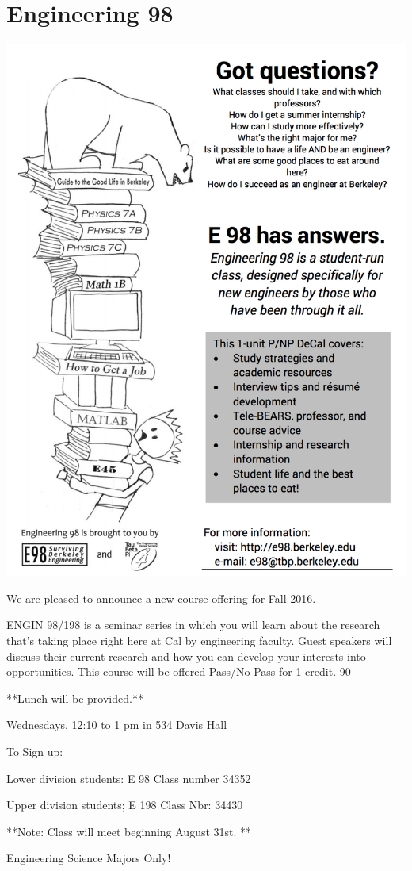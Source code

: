 \chapter*{Engineering 98}

\includegraphics{resources/e98-flyer}



We are pleased to announce a new course offering for Fall 2016.  
 
ENGIN 98/198 is a seminar series in which you will learn about the research that's taking place right here at Cal by engineering faculty.  Guest speakers will discuss their current research and how you can develop your interests into opportunities.   This course will be offered Pass/No Pass for 1 credit.  90%
 
**Lunch will be provided.**
 
Wednesdays, 12:10 to 1 pm in 534 Davis Hall
 
 
To Sign up:
 
Lower division students:
E 98 Class number 34352
 
Upper division students;
E 198 Class Nbr:  34430
 
 
**Note: Class will meet beginning August 31st. **
 
Engineering Science Majors Only!


